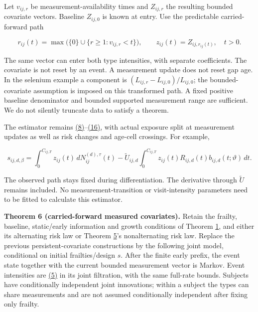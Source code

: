 \documentclass[11pt]{article}
\begin{document}
Let \(v_{ij,r}\) be measurement-availability times and \(Z_{ij,r}\) the resulting bounded covariate vectors. Baseline \(Z_{ij,0}\) is known at entry. Use the predictable carried-forward path

\begin{equation*}
r_{ij}(t)=\max\bigl(\{0\}\cup\{r\geq1:v_{ij,r}<t\}\bigr),\qquad
z_{ij}(t)=Z_{ij,r_{ij}(t)},\quad t>0.
\tag{75}\label{eq:75}
\end{equation*}

The same vector can enter both type intensities, with separate coefficients. The covariate is not reset by an event. A measurement update does not reset gap age. In the selenium example a component is \((L_{ij,r}-L_{ij,0})/L_{ij,0}\); the bounded-covariate assumption is imposed on this transformed path. A fixed positive baseline denominator and bounded supported measurement range are sufficient. We do not silently truncate data to satisfy a theorem.

The estimator remains \hyperref[eq:8]{(8)}--\hyperref[eq:16]{(16)}, with actual exposure split at measurement updates as well as risk changes and age-cell crossings. For example,

\begin{equation*}
s_{ij,d,\beta}=\int_0^{C_{ij,T}}z_{ij}(t)\,dN_{ij}^{(d),\tau}(t)
-\widetilde U_{ij,d}\int_0^{C_{ij,T}}z_{ij}(t)R_{ij,d}(t)b_{ij,d}(t;\vartheta)\,dt .
\tag{76}\label{eq:76}
\end{equation*}

The observed path stays fixed during differentiation. The derivative through \(\widetilde U\) remains included. No measurement-transition or visit-intensity parameters need to be fitted to calculate this estimator.

\label{res:Theorem-6}
\textbf{Theorem 6 (carried-forward measured covariates).} Retain the frailty, baseline, static/early information and growth conditions of Theorem \hyperref[res:Theorem-1]{1}, and either its alternating risk law or Theorem \hyperref[res:Theorem-5]{5}'s nonalternating risk law. Replace the previous persistent-covariate constructions by the following joint model, conditional on initial frailties/design \(s\). After the finite early prefix, the event state together with the current bounded measurement vector is Markov. Event intensities are \hyperref[eq:5]{(5)} in its joint filtration, with the same full-rate bounds. Subjects have conditionally independent joint innovations; within a subject the types can share measurements and are not assumed conditionally independent after fixing only frailty.
\end{document}
